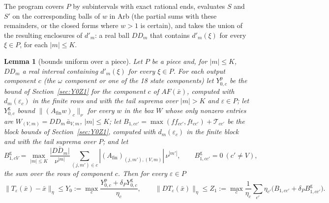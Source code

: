 \documentclass[11pt]{article}
\newtheorem{lemma}{Lemma}[section]
\theoremstyle{definition}
\begin{document}
The program covers $P$ by subintervals with exact rational ends, evaluates $S$ and $S'$ on the corresponding balls of $w$ in Arb (the partial sums with these remainders, or the closed forms where $w > 1$ is certain), and takes the union of the resulting enclosures of $d'_m$: a real ball $DD_m$ that contains $d'_m(\xi)$ for every $\xi \in P$, for each $|m| \le K$.

\begin{lemma}[bounds uniform over a piece]\label{lem:uniform}
Let $P$ be a piece and, for $|m| \le K$, $DD_m$ a real interval containing $d'_m(\xi)$ for every $\xi \in P$. For each output component $c$ (the $\omega$ component or one of the 18 state components) let $Y^{\mathrm p}_{0,c}$ be the bound of Section~\ref{sec:Y0Z1} for the component $c$ of $AF(\bar x)$, computed with $d_m(\varepsilon_c)$ in the finite rows and with the tail suprema over $|m| > K$ and $\varepsilon \in P$; let $Y^{\mathrm g}_{0,c}$ bound $\|(A_{\mathrm{fin}}w)_c\|_\nu$ for every $w$ in the box $W$ whose only nonzero entries are $W_{(V,m)} = DD_m\,\bar a_{V,m}$, $|m| \le K$; let $B_{1,cc'} = \max(f\!f_{cc'}, f\!t_{cc'}) + \mathcal T_{cc'}$ be the block bounds of Section~\ref{sec:Y0Z1}, computed with $d_m(\varepsilon_c)$ in the finite block and with the tail suprema over $P$; and let
\[ B^{\mathrm g}_{1,cV} = \max_{|m|\le K}\frac{\overline{|DD_m|}}{\nu^{|m|}}\sum_{(j,m')\in c}|(A_{\mathrm{fin}})_{(j,m'),(V,m)}|\,\nu^{|m'|}, \qquad B^{\mathrm g}_{1,cc'} = 0 \ (c' \ne V), \]
the sum over the rows of component $c$. Then for every $\varepsilon \in P$
\[ \|T_\varepsilon(\bar x) - \bar x\|_\eta \le Y_0 := \max_c\frac{Y^{\mathrm p}_{0,c} + \delta_PY^{\mathrm g}_{0,c}}{\eta_c}, \qquad \|DT_\varepsilon(\bar x)\|_\eta \le Z_1 := \max_c\frac1{\eta_c}\sum_{c'}\eta_{c'}\big(B_{1,cc'} + \delta_PB^{\mathrm g}_{1,cc'}\big). \]
\end{lemma}
\end{document}
